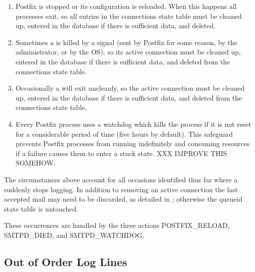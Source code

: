 \begin{enumerate}

    \item Postfix is stopped or its configuration is reloaded.  When this
        happens all  processes exit, so all entries in the
        connections state table must be cleaned up, entered in the database
        if there is sufficient data, and deleted.

    \item Sometimes a  is killed by a signal (sent by Postfix
        for some reason, by the administrator, or by the OS), so its active
        connection must be cleaned up, entered in the database if there is
        sufficient data, and deleted from the connections state table.

    \item Occasionally a  will exit uncleanly, so the active
        connection must be cleaned up, entered in the database if there is
        sufficient data, and deleted from the connections state table.

    \item Every Postfix process uses a watchdog which kills the process if
        it is not reset for a considerable period of time (five hours by
        default).  This safeguard prevents Postfix processes from running
        indefinitely and consuming resources if a failure causes them to
        enter a stuck state.  XXX IMPROVE THIS SOMEHOW\@.

\end{enumerate}

The circumstances above account for all occasions identified thus far where
a  suddenly stops logging.  In addition to removing an active
connection the last accepted mail may need to be discarded, as detailed in
; otherwise the queueid state table
is untouched.

These occurrences are handled by the three actions POSTFIX\_RELOAD,
SMTPD\_DIED, and SMTPD\_WATCHDOG\@.

\subsection{Out of Order Log Lines}

\label{out of order log lines}

